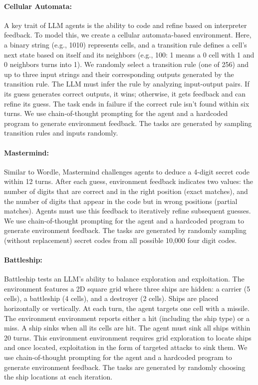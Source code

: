 \paragraph{Cellular Automata: } A key trait of LLM agents is the ability to code and refine based on interpreter feedback. To model this, we create a cellular automata-based environment. Here, a binary string (e.g., 1010) represents cells, and a transition rule defines a cell’s next state based on itself and its neighbors (e.g., 100: 1 means a 0 cell with 1 and 0 neighbors turns into 1). We randomly select a transition rule (one of 256) and up to three input strings and their corresponding outputs generated by the transition rule. The LLM must infer the rule by analyzing input-output pairs. If its guess generates correct outputs, it wins; otherwise, it gets feedback and can refine its guess. The task ends in failure if the correct rule isn’t found within six turns. We use chain-of-thought prompting for the agent and a hardcoded program to generate environment feedback. The tasks are generated by sampling transition rules and inputs randomly.

\paragraph{Mastermind: } Similar to Wordle, Mastermind challenges agents to deduce a 4-digit secret code within 12 turns. After each guess, environment feedback indicates two values: the number of digits that are correct and in the right position (exact matches), and the number of digits that appear in the code but in wrong positions (partial matches). Agents must use this feedback to iteratively refine subsequent guesses. We use chain-of-thought prompting for the agent and a hardcoded program to generate environment feedback. The tasks are generated by randomly sampling (without replacement) secret codes from all possible 10,000 four digit codes.

\paragraph{Battleship: } Battleship tests an LLM's ability to balance exploration and exploitation. The environment features a 2D square grid where three ships are hidden: a carrier (5 cells), a battleship (4 cells), and a destroyer (2 cells). Ships are placed horizontally or vertically.
At each turn, the agent targets one cell with a missile. The environment environment reports either a hit (including the ship type) or a miss. A ship sinks when all its cells are hit. The agent must sink all ships within 20 turns. This environment environment requires grid exploration to locate ships and once located, exploitation in the form of targeted attacks to sink them. We use chain-of-thought prompting for the agent and a hardcoded program to generate environment feedback. The tasks are generated by randomly choosing the ship locations at each iteration.


